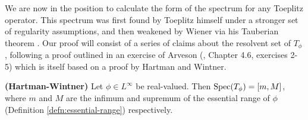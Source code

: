 \documentclass[../main.tex]{subfiles}
\begin{document}
We are now in the position to calculate the form of the spectrum for any Toeplitz operator. This spectrum was first found by Toeplitz
himself under a stronger set of regularity assumptions, and then weakened by Wiener via his Tauberian theorem \parencite{schmidt1960toeplitz}.
Our proof will consist of a series of claims about the resolvent set of $T_\phi$, following a proof outlined in an exercise of Arveson (\parencite{arveson2002short}, Chapter 4.6, exercises 2-5) which is itself based on a proof by Hartman and Wintner.

\begin{theorem}{\textbf{(Hartman-Wintner)}}\label{thm:hartman-wintner}
Let $\phi \in L^\infty$ be real-valued. Then $\mathrm{Spec}(T_\phi) = [m, M]$, where $m$ and $M$ are the infimum and supremum of the essential range of $\phi$ (Definition \ref{defn:essential-range}) respectively.
\end{theorem}
\end{document}
